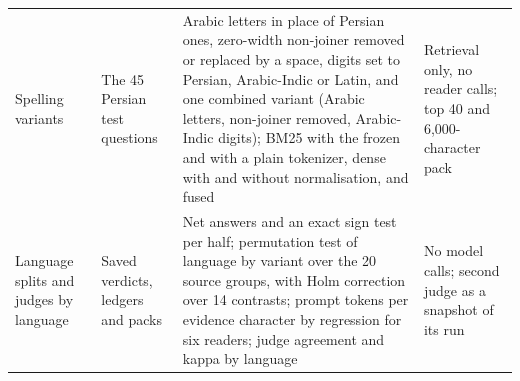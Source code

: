 \begin{table}[tp]
\begin{tabularx}{\textwidth}{@{}p{2.6cm}p{2.9cm}Xp{2.8cm}@{}}
Spelling variants & The 45 Persian test questions & Arabic letters in place of Persian ones, zero-width non-joiner removed or replaced by a space, digits set to Persian, Arabic-Indic or Latin, and one combined variant (Arabic letters, non-joiner removed, Arabic-Indic digits); BM25 with the frozen and with a plain tokenizer, dense with and without normalisation, and fused & Retrieval only, no reader calls; top 40 and 6,000-character pack \\
Language splits and judges by language & Saved verdicts, ledgers and packs & Net answers and an exact sign test per half; permutation test of language by variant over the 20 source groups, with Holm correction over 14 contrasts; prompt tokens per evidence character by regression for six readers; judge agreement and kappa by language & No model calls; second judge as a snapshot of its run \\
\bottomrule
\end{tabularx}
\end{table}
